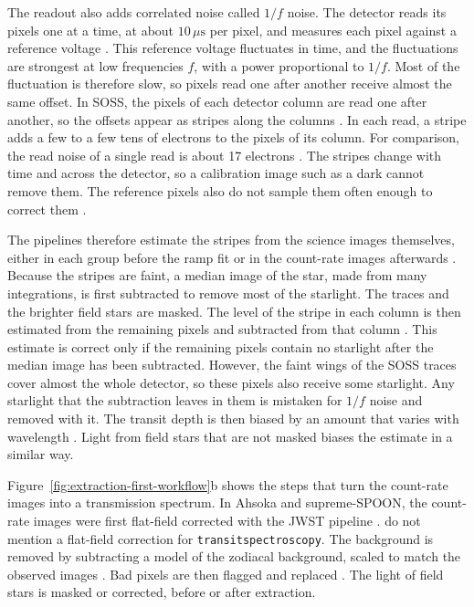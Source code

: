 The readout also adds correlated noise called $1/f$ noise. The detector
reads its pixels one at a time, at about $10\,\mu\mathrm{s}$ per pixel, and measures
each pixel against a reference voltage \citep{AlbertEtAl2023}. This reference
voltage fluctuates in time, and the fluctuations are strongest at low
frequencies $f$, with a power proportional to $1/f$. Most of the fluctuation
is therefore slow, so pixels read one after another receive almost the same
offset. In SOSS, the pixels of each detector column are read one after
another, so the offsets appear as stripes along the columns
\citep{AlbertEtAl2023,RadicaEtAl2023}. In each read, a stripe adds a few to a
few tens of electrons to the pixels of its column. For comparison, the read
noise of a single read is about 17 electrons \citep{AlbertEtAl2023}. The
stripes change with time and across the detector, so a calibration image such
as a dark cannot remove them. The reference pixels also do not sample them
often enough to correct them \citep{AlbertEtAl2023,RadicaEtAl2023}.

The pipelines therefore estimate the stripes from the science images
themselves, either in each group before the ramp fit or in the count-rate
images afterwards \citep{LouieEtAl2025}. Because the stripes are faint, a
median image of the star, made from many integrations, is first subtracted to
remove most of the starlight. The traces and the brighter field stars are
masked. The level of the stripe in each column is then estimated from the
remaining pixels and subtracted from that column
\citep{AlbertEtAl2023,RadicaEtAl2023,LouieEtAl2025}. This estimate is correct
only if the remaining pixels contain no starlight after the median image has
been subtracted. However, the faint wings of the SOSS traces cover almost the
whole detector, so these pixels also receive some starlight. Any starlight
that the subtraction leaves in them is mistaken for $1/f$ noise and removed
with it. The transit depth is then biased by an amount that varies with
wavelength \citep{RadicaEtAl2023}. Light from field stars that are not masked
biases the estimate in a similar way.

Figure~\ref{fig:extraction-first-workflow}b shows the steps that turn the
count-rate images into a transmission spectrum. In Ahsoka and supreme-SPOON, the count-rate images were first flat-field corrected with the JWST pipeline \citep{RadicaEtAl2023,LouieEtAl2025}. \citet{LouieEtAl2025} do not mention a flat-field correction for \texttt{transitspectroscopy}. The
background is removed by subtracting a model of the zodiacal background,
scaled to match the observed images \citep{LouieEtAl2025}. Bad pixels are
then flagged and replaced \citep{LouieEtAl2025}. The light of
field stars is masked or corrected, before or after extraction.

